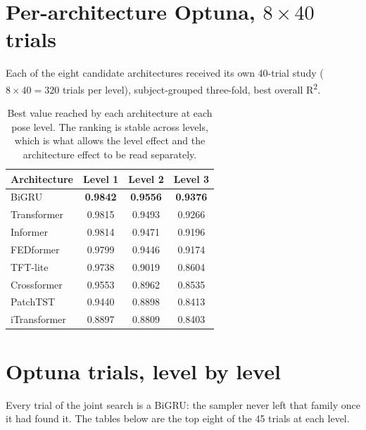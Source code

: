 \section{Per-architecture Optuna, $8\times40$ trials}

Each of the eight candidate architectures received its own 40-trial study
($8\times40=320$ trials per level), subject-grouped three-fold, best overall
R\textsuperscript{2}.

\begin{table}[H]
\centering
\caption{Best value reached by each architecture at each pose level. The ranking
is stable across levels, which is what allows the level effect and the
architecture effect to be read separately.}
\label{tab:app:8x40}
\small
\begin{tabular}{@{}lccc@{}}
\toprule
\textbf{Architecture} & \textbf{Level 1} & \textbf{Level 2} & \textbf{Level 3} \\
\midrule
BiGRU        & \textbf{0.9842} & \textbf{0.9556} & \textbf{0.9376} \\
Transformer  & 0.9815 & 0.9493 & 0.9266 \\
Informer     & 0.9814 & 0.9471 & 0.9196 \\
FEDformer    & 0.9799 & 0.9446 & 0.9174 \\
TFT-lite     & 0.9738 & 0.9019 & 0.8604 \\
Crossformer  & 0.9553 & 0.8962 & 0.8535 \\
PatchTST     & 0.9440 & 0.8898 & 0.8413 \\
iTransformer & 0.8897 & 0.8809 & 0.8403 \\
\bottomrule
\end{tabular}
\end{table}

\section{Optuna trials, level by level}

Every trial of the joint search is a BiGRU: the sampler never left that
family once it had found it. The tables below are the top eight of the 45
trials at each level.

